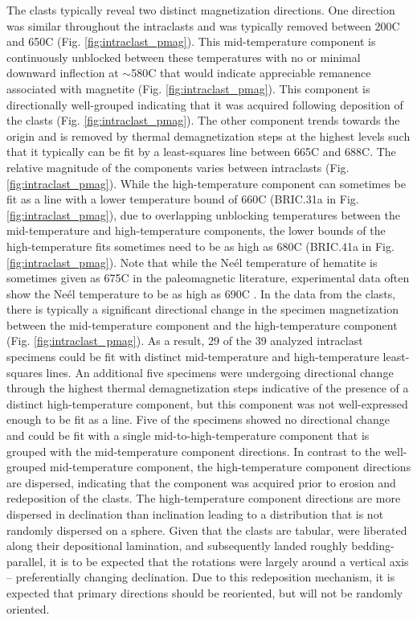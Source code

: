 \documentclass[draft]{agujournal2018}
\begin{document}
The clasts typically reveal two distinct magnetization directions. One direction was similar throughout the intraclasts and was typically removed between 200\textdegree C and 650\textdegree C (Fig. \ref{fig:intraclast_pmag}). This mid-temperature component is continuously unblocked between these temperatures with no or minimal downward inflection at $\sim$580\textdegree C that would indicate appreciable remanence associated with magnetite (Fig. \ref{fig:intraclast_pmag}). This component is directionally well-grouped indicating that it was acquired following deposition of the clasts (Fig. \ref{fig:intraclast_pmag}). The other component trends towards the origin and is removed by thermal demagnetization steps at the highest levels such that it typically can be fit by a least-squares line between 665\textdegree C and 688\textdegree C. The relative magnitude of the components varies between intraclasts (Fig. \ref{fig:intraclast_pmag}). While the high-temperature component can sometimes be fit as a line with a lower temperature bound of 660\textdegree C (BRIC.31a in Fig. \ref{fig:intraclast_pmag}), due to overlapping unblocking temperatures between the mid-temperature and high-temperature components, the lower bounds of the high-temperature fits sometimes need to be as high as 680\textdegree C (BRIC.41a in Fig. \ref{fig:intraclast_pmag}). Note that while the Ne\'el temperature of hematite is sometimes given as 675\textdegree C in the paleomagnetic literature, experimental data often show the Ne\'el temperature to be as high as 690\textdegree C \citep{Ozdemir2006a}. In the data from the clasts, there is typically a significant directional change in the specimen magnetization between the mid-temperature component and the high-temperature component (Fig. \ref{fig:intraclast_pmag}). As a result, 29 of the 39 analyzed intraclast specimens could be fit with distinct mid-temperature and high-temperature least-squares lines. An additional five specimens were undergoing directional change through the highest thermal demagnetization steps indicative of the presence of a distinct high-temperature component, but this component was not well-expressed enough to be fit as a line. Five of the specimens showed no directional change and could be fit with a single mid-to-high-temperature component that is grouped with the mid-temperature component directions. In contrast to the well-grouped mid-temperature component, the high-temperature component directions are dispersed, indicating that the component was acquired prior to erosion and redeposition of the clasts. The high-temperature component directions are more dispersed in declination than inclination leading to a distribution that is not randomly dispersed on a sphere. Given that the clasts are tabular, were liberated along their depositional lamination, and subsequently landed roughly bedding-parallel, it is to be expected that the rotations were largely around a vertical axis -- preferentially changing declination. Due to this redeposition mechanism, it is expected that primary directions should be reoriented, but will not be randomly oriented.
\end{document}

